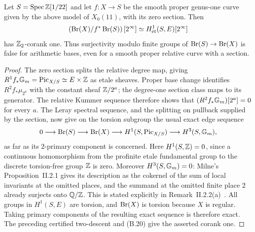 \begin{proposition}
\label{prop:B-Brauer-arithmetic}
Let \(S=\operatorname{Spec}\mathbb Z[1/22]\) and let \(f:X\to S\) be the smooth
proper genus-one curve given by the above model of \(X_0(11)\), with
its zero section.  Then
\[
 \left(\operatorname{Br}(X)/f^*\operatorname{Br}(S)\right)[2^\infty]
 \simeq H^1_{\mathrm{\acute et}}(S,E)[2^\infty]
\]
has \(\mathbb Z_2\)-corank one.  Thus surjectivity modulo finite groups
of \(\operatorname{Br}(S)\to\operatorname{Br}(X)\) is false for arithmetic bases, even for
a smooth proper relative curve with a section.
\end{proposition}
\begin{proof}
The zero section splits the relative degree map, giving
\(R^1f_*{\mathbb G_m}=\operatorname{Pic}_{X/S}\simeq E\times\mathbb Z\) as etale sheaves.
Proper base change identifies \(R^2f_*\mu_{2^a}\) with the
constant sheaf \(\mathbb Z/2^a\); the degree-one section class maps to its
generator.  The relative Kummer sequence therefore shows that
\((R^2f_*{\mathbb G_m})[2^a]=0\) for every \(a\).  The Leray
spectral sequence, and the splitting on pullback supplied by the
section, now give on the torsion subgroup the usual exact edge
sequence
\[
 0\longrightarrow\operatorname{Br}(S)\longrightarrow\operatorname{Br}(X)
 \longrightarrow H^1(S,\operatorname{Pic}_{X/S})
 \longrightarrow H^3(S,{\mathbb G_m}),
\]
as far as its \(2\)-primary component is concerned.  Here
\(H^1(S,\mathbb Z)=0\), since a continuous homomorphism from the profinite
etale fundamental group to the discrete torsion-free group \(\mathbb Z\)
is zero.  Moreover \(H^3(S,{\mathbb G_m})=0\): Milne's
Proposition~II.2.1 gives its description as the cokernel of the
sum of local invariants at the omitted places, and the summand at
the omitted finite place \(2\) already surjects onto \(\mathbb Q/\mathbb Z\).
This is stated explicitly in Remark~II.2.2(a)~\cite{AMilneADT}.
All groups in \(H^1(S,E)\) are torsion, and \(\operatorname{Br}(X)\) is
torsion because \(X\) is regular.  Taking primary components of
the resulting exact sequence is therefore exact.  The preceding
certified two-descent and (B.20) give the asserted corank one.
\end{proof}

